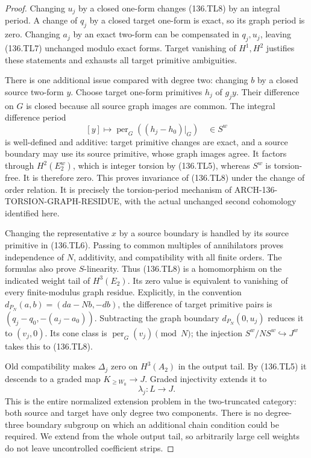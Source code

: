 \begin{proof}
Changing \(u_j\) by a closed one-form changes (136.TL8)
by an integral period.  A change of \(q_j\) by a closed
target one-form is exact, so its graph period is zero.
Changing \(a_j\) by an exact two-form can be compensated
in \(q_j,u_j\), leaving (136.TL7) unchanged modulo exact
forms.  Target vanishing of \(H^1,H^2\) justifies these
statements and exhausts all target primitive ambiguities.

There is one additional issue compared with degree two:
changing \(b\) by a closed source two-form \(y\).
Choose target one-form primitives \(h_j\) of \(g_jy\).
Their difference on \(G\) is closed because all source
graph images are common.  The integral difference period
\[
                [y]\longmapsto
                    \operatorname{per}_G((h_j-h_0)|_G)
                            \quad\in S^w
                                                               \tag{136.TL9}
\]
is well-defined and additive: target primitive changes are
exact, and a source boundary may use its source primitive,
whose graph images agree.  It factors through \(H^2(E_2^w)\),
which is integer torsion by (136.TL5), whereas \(S^w\)
is torsion-free.  It is therefore zero.  This proves invariance
of (136.TL8) under the change of order relation.  It is precisely
the torsion-period mechanism of ARCH-136-TORSION-GRAPH-RESIDUE,
with the actual unchanged second cohomology identified here.

Changing the representative \(x\) by a source boundary is
handled by its source primitive in (136.TL6).  Passing to common
multiples of annihilators proves independence of \(N\),
additivity, and compatibility with all finite orders.  The
formulas also prove \(S\)-linearity.  Thus (136.TL8) is a
homomorphism on the indicated weight tail of \(H^3(E_2)\).
Its zero value is equivalent to vanishing of every finite-modulus
graph residue.  Explicitly, in the convention
\(d_{P_N}(a,b)=(da-Nb,-db)\), the difference of target
primitive pairs is \((q_j-q_0,-(a_j-a_0))\).
Subtracting the graph boundary \(d_{P_N}(0,u_j)\) reduces
it to \((v_j,0)\).  Its cone class is
\(\operatorname{per}_G(v_j)\pmod N\); the injection
\(S^w/NS^w\hookrightarrow J^w\) takes this to (136.TL8).

Old compatibility makes \(\Delta_j\) zero on \(H^3(A_2)\)
in the output tail.  By (136.TL5) it descends to a graded
map \(K_{\geq W_0}\to J\).  Graded injectivity extends
it to
\[
                            \lambda_j:L\longrightarrow J.
                                                               \tag{136.TL10}
\]
This is the entire normalized extension problem in the
two-truncated category: both source and target have only degree
two components.  There is no degree-three boundary subgroup
on which an additional chain condition could be required.
We extend from the whole output tail, so arbitrarily large
cell weights do not leave uncontrolled coefficient strips.


\end{proof}
